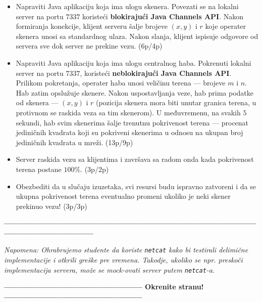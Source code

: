 \documentclass[]{article}
\begin{document}
\begin{enumerate}
\begin{itemize}
  \item Napraviti Java aplikaciju koja ima ulogu skenera. Povezati se na lokalni server na portu $7337$ koristeći \textbf{blokiraju\'c{}i Java Channels API}. Nakon formiranja konekcije, klijent serveru \v{s}alje brojeve $(x,y)$ i $r$ koje operater skenera unosi sa standardnog ulaza. Nakon slanja, klijent ispisuje odgovore od servera sve dok server ne prekine vezu. \hfill (6p/4p)
  \item Napraviti Java aplikaciju koja ima ulogu centralnog haba. Pokrenuti lokalni server na portu $7337$, koriste\'c{}i \textbf{neblokiraju\'c{}i Java Channels API}. Prilikom pokretanja, operater haba unosi veli\v{c}inu terena --- brojeve $m$ i $n$. Hab zatim opslu\v{z}uje skenere. Nakon uspostavljanja veze, hab prima podatke od skenera --- $(x,y)$ i $r$ (pozicija skenera mora biti unutar granica terena, u protivnom se raskida veza sa tim skenerom). U međuvremenu, na svakih $5$ sekundi, hab svim skenerima \v{s}alje trenutnu pokrivenost terena --- procenat jedini\v{c}nih kvadrata koji su pokriveni skenerima u odnosu na ukupan broj jedini\v{c}nih kvadrata u mre\v{z}i. \hfill (13p/9p)
  \item Server raskida vezu sa klijentima i zavr\v{s}ava sa radom onda kada pokrivenost terena postane $100\%$. \hfill (3p/2p)
  \item Obezbediti da u slučaju izuzetaka, svi resursi budu ispravno zatvoreni i da se ukupna pokrivenost terena eventualno promeni ukoliko je neki skener prekinuo vezu! \hfill (3p/3p)
\end{itemize}

\vspace{5pt}
\begin{center}
  \textbf{------------------------------------------------------------------------------------------------------------------------------}
\end{center}
\textit{Napomena: Ohrabrujemo studente da koriste \texttt{netcat} kako bi testirali delimi\v{c}ne implementacije i otkrili gre\v{s}ke pre vremena. Takodje, ukoliko se npr. presko\v{c}i implementacija servera, mo\v{z}e se mock-ovati server putem \texttt{netcat}-a.} 
\begin{center}
  \textbf{--------------------------------------------------- Okrenite stranu! ---------------------------------------------------}
\end{center}
\newpage


\end{enumerate}
\end{document}
